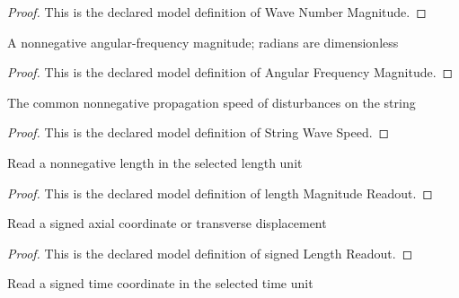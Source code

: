 \begin{proof}
  This is the declared model definition of Wave Number Magnitude.
\end{proof}
\begin{definition}
  \label{def:physics:phyx-mini-0297:phyxminiproblems-problemphyxmini0297-angularfrequencymagnitude}
  A nonnegative angular-frequency magnitude; radians are dimensionless
\end{definition}
\begin{proof}
  This is the declared model definition of Angular Frequency Magnitude.
\end{proof}
\begin{definition}
  \label{def:physics:phyx-mini-0297:phyxminiproblems-problemphyxmini0297-stringwavespeed}
  The common nonnegative propagation speed of disturbances on the string
\end{definition}
\begin{proof}
  This is the declared model definition of String Wave Speed.
\end{proof}
\begin{definition}
  \label{def:physics:phyx-mini-0297:phyxminiproblems-problemphyxmini0297-lengthmagnitudereadout}
  Read a nonnegative length in the selected length unit
\end{definition}
\begin{proof}
  This is the declared model definition of length Magnitude Readout.
\end{proof}
\begin{definition}
  \label{def:physics:phyx-mini-0297:phyxminiproblems-problemphyxmini0297-signedlengthreadout}
  Read a signed axial coordinate or transverse displacement
\end{definition}
\begin{proof}
  This is the declared model definition of signed Length Readout.
\end{proof}
\begin{definition}
  \label{def:physics:phyx-mini-0297:phyxminiproblems-problemphyxmini0297-timecoordinatereadout}
  Read a signed time coordinate in the selected time unit
\end{definition}
